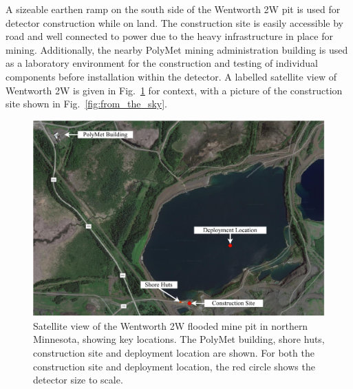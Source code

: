 A sizeable earthen ramp on the south side of the Wentworth 2W pit is used for detector
construction while on land. The construction site is easily accessible by road and well connected
to power due to the heavy infrastructure in place for mining. Additionally, the nearby PolyMet
mining administration building is used as a laboratory environment for the construction and
testing of individual components before installation within the detector. A labelled satellite
view of Wentworth 2W is given in Fig.~\ref{fig:pit} for context, with a picture of the
construction site shown in Fig.~\ref{fig:from_the_sky}.

\begin{figure} %
    \includegraphics[width=\textwidth]{diagrams/4-chips/pit.pdf}
    \caption[Satellite view of the Wentworth 2W mine pit in northern Minnesota]
    {Satellite view of the Wentworth 2W flooded mine pit in northern Minnesota, showing key
        \chipsfive locations. The PolyMet building, shore huts, construction site and deployment
        location are shown. For both the construction site and deployment location, the red circle
        shows the \chipsfive detector size to scale.}
    \label{fig:pit}
\end{figure}

